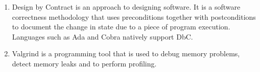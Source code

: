 \documentclass{article}
\begin{document}
\begin{enumerate}
    \item Design by Contract is an approach to designing software. It is a software correctness methodology that uses preconditions together with postconditions to document the change in state due to a piece of program execution. Languages such as Ada and Cobra natively support DbC.
    \item Valgrind is a programming tool that is used to debug memory problems, detect memory leaks and to perform profiling.
\end{enumerate}


 
\cite{website:fermentas-lambda}
\cite{toptenesolangs}
\cite{omgrofl}
\cite{brainfuck}
\cite{emacs}
\cite{c++vsobjective-c}
\cite{c++}
\cite{objective-c}
\cite{valgrind}
\cite{alice}
\cite{alicesoftware}
\cite{aliceguide}
\cite{dbc}
\cite{scala}
\end{document}
